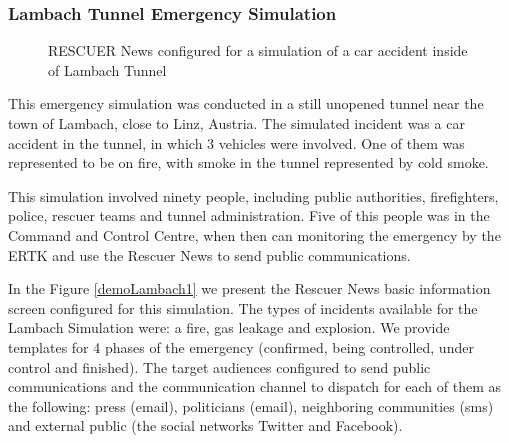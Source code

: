 \subsubsection{Lambach Tunnel Emergency Simulation}

\begin{figure}[!ht]
\centering
{}
\quad %
\caption{RESCUER News configured for a simulation of a car accident inside of Lambach Tunnel}
\label{demoLambach}
\end{figure}

This emergency simulation was conducted in a still unopened tunnel near the town of Lambach,
close to Linz, Austria. The simulated incident was a car accident in the tunnel, in which 3 vehicles were involved. One of them was represented to be on fire, with smoke in the tunnel represented by cold smoke.

This simulation involved ninety people, including public authorities, firefighters, police, rescuer teams and tunnel administration. Five of this people was in the Command and Control Centre, when then can monitoring the emergency by the ERTK and use the Rescuer News to send public communications.

In the Figure \ref{demoLambach1} we present the Rescuer News basic information screen configured for this simulation. The types of incidents available for the Lambach Simulation were: a fire, gas leakage and explosion. We provide templates for 4 phases of the emergency (confirmed, being controlled, under control and finished). The target audiences configured to send public communications and the communication channel to dispatch for each of them as the following: press (email), politicians (email), neighboring communities (sms) and external public (the social networks Twitter and Facebook).

